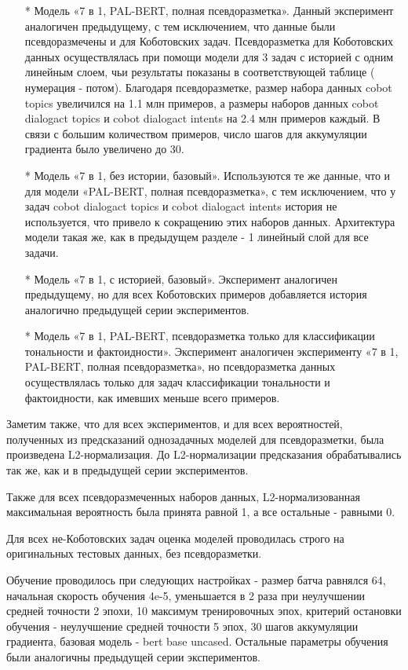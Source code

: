 \begin{itemize}
\item[*] Модель «7 в 1, PAL-BERT, полная псевдоразметка». Данный эксперимент аналогичен предыдущему, с тем исключением, что данные были псевдоразмечены и для Коботовских задач. Псевдоразметка для Коботовских данных осуществлялась при помощи модели для 3 задач с историей с одним линейным слоем, чьи результаты показаны в соответствующей таблице ( нумерация - потом). Благодаря псевдоразметке, размер набора данных cobot topics увеличился на 1.1 млн примеров, а размеры наборов данных cobot dialogact topics и cobot dialogact intents на 2.4 млн примеров каждый. В связи с большим количеством примеров, число шагов для аккумуляции градиента было увеличено до 30.

\item[*] Модель «7 в 1, без истории, базовый». Используются те же данные, что и для модели «PAL-BERT, полная псевдоразметка», с тем исключением, что у задач cobot dialogact topics и cobot dialogact intents история не используется, что привело к сокращению этих наборов данных. Архитектура модели такая же, как в предыдущем разделе - 1 линейный слой для все задачи.

\item[*] Модель «7 в 1, с историей, базовый». Эксперимент аналогичен предыдущему, но для всех Коботовских примеров добавляется история аналогично предыдущей серии экспериментов.

\item[*] Модель «7 в 1, PAL-BERT, псевдоразметка только для классификации тональности и фактоидности». Эксперимент аналогичен эксперименту «7 в 1, PAL-BERT, полная псевдоразметка», но псевдоразметка данных осуществлялась только для задач классификации тональности и фактоидности, как имевших меньше всего примеров.

\end{itemize}
Заметим также, что для всех экспериментов, и для всех вероятностей, полученных из предсказаний однозадачных моделей для псевдоразметки, была произведена L2-нормализация. До L2-нормализации предсказания обрабатывались так же, как и в предыдущей серии экспериментов.

Также для всех псевдоразмеченных наборов данных, L2-нормализованная максимальная вероятность была принята равной 1, а все остальные - равными 0.

Для всех не-Коботовских задач оценка моделей проводилась строго на оригинальных тестовых данных, без псевдоразметки.

Обучение проводилось при следующих настройках - размер батча равнялся 64, начальная скорость обучения 4e-5, уменьшается в 2 раза при неулучшении средней точности 2 эпохи, 10 максимум тренировочных эпох, критерий остановки обучения - неулучшение средней точности 5 эпох, 30 шагов аккумуляции градиента, базовая модель - bert base uncased. Остальные параметры обучения были аналогичны предыдущей серии экспериментов.

